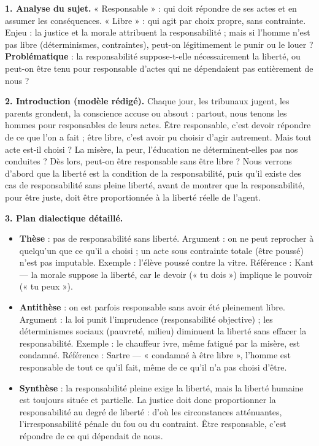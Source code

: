 \documentclass[11pt]{article}
\begin{document}
\begin{corrige}
\textbf{1. Analyse du sujet.} « Responsable » : qui doit répondre de ses actes et en assumer les conséquences. « Libre » : qui agit par choix propre, sans contrainte. Enjeu : la justice et la morale attribuent la responsabilité ; mais si l'homme n'est pas libre (déterminismes, contraintes), peut-on légitimement le punir ou le louer ? \textbf{Problématique} : la responsabilité suppose-t-elle nécessairement la liberté, ou peut-on être tenu pour responsable d'actes qui ne dépendaient pas entièrement de nous ?

\textbf{2. Introduction (modèle rédigé).} Chaque jour, les tribunaux jugent, les parents grondent, la conscience accuse ou absout : partout, nous tenons les hommes pour responsables de leurs actes. Être responsable, c'est devoir répondre de ce que l'on a fait ; être libre, c'est avoir pu choisir d'agir autrement. Mais tout acte est-il choisi ? La misère, la peur, l'éducation ne déterminent-elles pas nos conduites ? Dès lors, peut-on être responsable sans être libre ? Nous verrons d'abord que la liberté est la condition de la responsabilité, puis qu'il existe des cas de responsabilité sans pleine liberté, avant de montrer que la responsabilité, pour être juste, doit être proportionnée à la liberté réelle de l'agent.

\textbf{3. Plan dialectique détaillé.}
\begin{itemize}
\item \textbf{Thèse} : pas de responsabilité sans liberté. Argument : on ne peut reprocher à quelqu'un que ce qu'il a choisi ; un acte sous contrainte totale (être poussé) n'est pas imputable. Exemple : l'élève poussé contre la vitre. Référence : Kant — la morale suppose la liberté, car le devoir (« tu dois ») implique le pouvoir (« tu peux »).
\item \textbf{Antithèse} : on est parfois responsable sans avoir été pleinement libre. Argument : la loi punit l'imprudence (responsabilité objective) ; les déterminismes sociaux (pauvreté, milieu) diminuent la liberté sans effacer la responsabilité. Exemple : le chauffeur ivre, même fatigué par la misère, est condamné. Référence : Sartre — « condamné à être libre », l'homme est responsable de tout ce qu'il fait, même de ce qu'il n'a pas choisi d'être.
\item \textbf{Synthèse} : la responsabilité pleine exige la liberté, mais la liberté humaine est toujours située et partielle. La justice doit donc proportionner la responsabilité au degré de liberté : d'où les circonstances atténuantes, l'irresponsabilité pénale du fou ou du contraint. Être responsable, c'est répondre de ce qui dépendait de nous.
\end{itemize}


\end{corrige}
\end{document}
